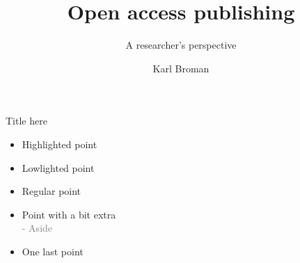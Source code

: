 \documentclass[12pt]{beamer}
\title{Open access publishing}
\subtitle{\textcolor{subtitle}{A researcher's perspective}}
\author{Karl Broman}
\institute{\textcolor{gray}{Biostatistics \& Medical Informatics \\[2pt] University of Wisconsin{\textendash}Madison}}
\date{}
\begin{document}
{
\frame{\titlepage}
}



\begin{frame}{Title here}
\begin{itemize}
\item {\textcolor{hilight}{Highlighted point}}
\item {\textcolor{lolight}{Lowlighted point}}
\item Regular point
\item Point with a bit extra \\
\textcolor{gray}{\footnotesize - Aside}
\item One last point
\end{itemize}
\end{frame}
\end{document}
